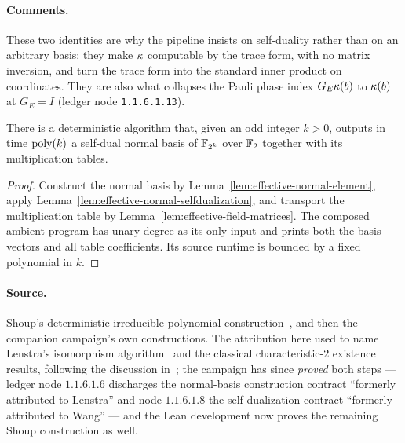 \paragraph{Comments.} These two identities are why the pipeline insists on self-duality rather
than on an arbitrary basis: they make $\kappa$ computable by the trace form, with no matrix
inversion, and turn the trace form into the standard inner product on coordinates. They are
also what collapses the Pauli phase index $G_E \kappa(b)$ to $\kappa(b)$ at $G_E = I$
(ledger node \texttt{1.1.6.1.13}).

\begin{lemma}
\label{lem:self-dual-basis}
\leanok
There is a deterministic algorithm that, given an odd integer $k > 0$, outputs in time
$\mathrm{poly}(k)$ a self-dual normal basis of $\mathbb{F}_{2^k}$ over $\mathbb{F}_2$ together with its
multiplication tables.
\end{lemma}
\begin{proof}
\leanok
Construct the normal basis by Lemma~\ref{lem:effective-normal-element}, apply
Lemma~\ref{lem:effective-normal-selfdualization}, and transport the multiplication
table by Lemma~\ref{lem:effective-field-matrices}. The composed ambient program
has unary degree as its only input and prints both the basis vectors and all
table coefficients. Its source runtime is bounded by a fixed polynomial in $k$.
\end{proof}

\paragraph{Source.} Shoup's deterministic irreducible-polynomial
construction~\cite{Sho90}, and then the companion campaign's own constructions. The
attribution here used to name Lenstra's isomorphism algorithm~\cite{Len91} and the classical
characteristic-$2$ existence results, following the discussion
in~\cite[Section 3]{JNVWY20}; the campaign has since \emph{proved} both steps --- ledger node
$1.1.6.1.6$ discharges the normal-basis construction contract ``formerly attributed to
Lenstra'' and node $1.1.6.1.8$ the self-dualization contract ``formerly attributed to Wang''
--- and the Lean development now proves the remaining Shoup construction as well.

